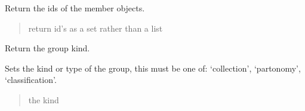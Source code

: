 \documentclass[letterpaper,12pt,english]{sphinxmanual}
\begin{document}
\begin{fulllineitems}
\begin{fulllineitems}
\begin{quote}
\begin{description}
\end{description}\end{quote}

\end{fulllineitems}


\begin{fulllineitems}
\label{\detokenize{api/core:cbmpy.CBModel.Group.getMemberIDs}}
\pysigstartsignatures
\pysiglinewithargsret
{}
{}
{}
\pysigstopsignatures
\sphinxAtStartPar
Return the ids of the member objects.
\begin{quote}\begin{description}
\sphinxAtStartPar
{} \textendash{} return id’s as a set rather than a list

\end{description}\end{quote}

\end{fulllineitems}


\begin{fulllineitems}
\label{\detokenize{api/core:cbmpy.CBModel.Group.getKind}}
\pysigstartsignatures
\pysiglinewithargsret
{}
{}
{}
\pysigstopsignatures
\sphinxAtStartPar
Return the group kind.

\end{fulllineitems}


\begin{fulllineitems}
\label{\detokenize{api/core:cbmpy.CBModel.Group.setKind}}
\pysigstartsignatures
\pysiglinewithargsret
{}
{}
{}
\pysigstopsignatures
\sphinxAtStartPar
Sets the kind or type of the group, this must be one of: ‘collection’, ‘partonomy’, ‘classification’.
\begin{quote}\begin{description}
\sphinxAtStartPar
{} \textendash{} the kind


\end{description}
\end{quote}
\end{fulllineitems}
\end{fulllineitems}
\end{document}
